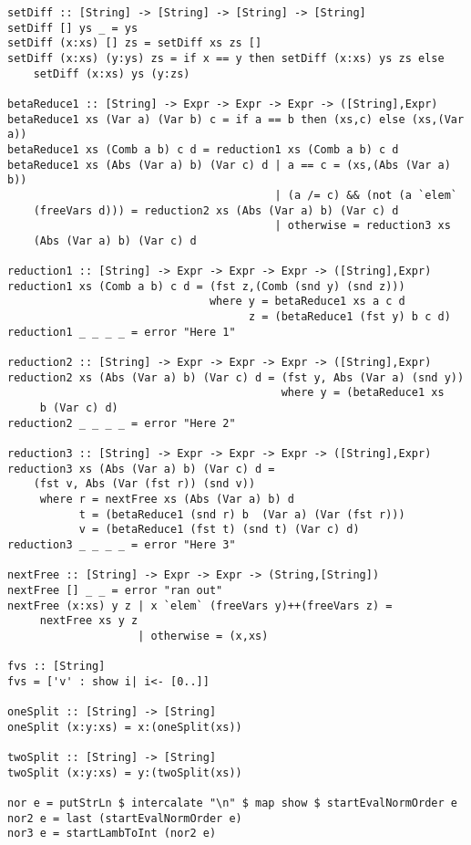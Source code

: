 \documentclass[11pt]{article}
\begin{document}
\begin{verbatim}
setDiff :: [String] -> [String] -> [String] -> [String]
setDiff [] ys _ = ys
setDiff (x:xs) [] zs = setDiff xs zs []
setDiff (x:xs) (y:ys) zs = if x == y then setDiff (x:xs) ys zs else 
    setDiff (x:xs) ys (y:zs)

betaReduce1 :: [String] -> Expr -> Expr -> Expr -> ([String],Expr)
betaReduce1 xs (Var a) (Var b) c = if a == b then (xs,c) else (xs,(Var a))
betaReduce1 xs (Comb a b) c d = reduction1 xs (Comb a b) c d
betaReduce1 xs (Abs (Var a) b) (Var c) d | a == c = (xs,(Abs (Var a) b))
                                         | (a /= c) && (not (a `elem` 
    (freeVars d))) = reduction2 xs (Abs (Var a) b) (Var c) d
                                         | otherwise = reduction3 xs 
    (Abs (Var a) b) (Var c) d
                                          
reduction1 :: [String] -> Expr -> Expr -> Expr -> ([String],Expr)
reduction1 xs (Comb a b) c d = (fst z,(Comb (snd y) (snd z)))
                               where y = betaReduce1 xs a c d
                                     z = (betaReduce1 (fst y) b c d)
reduction1 _ _ _ _ = error "Here 1"

reduction2 :: [String] -> Expr -> Expr -> Expr -> ([String],Expr)
reduction2 xs (Abs (Var a) b) (Var c) d = (fst y, Abs (Var a) (snd y))
                                          where y = (betaReduce1 xs
     b (Var c) d)
reduction2 _ _ _ _ = error "Here 2"

reduction3 :: [String] -> Expr -> Expr -> Expr -> ([String],Expr)
reduction3 xs (Abs (Var a) b) (Var c) d = 
    (fst v, Abs (Var (fst r)) (snd v))
     where r = nextFree xs (Abs (Var a) b) d
           t = (betaReduce1 (snd r) b  (Var a) (Var (fst r)))
           v = (betaReduce1 (fst t) (snd t) (Var c) d)
reduction3 _ _ _ _ = error "Here 3"

nextFree :: [String] -> Expr -> Expr -> (String,[String])
nextFree [] _ _ = error "ran out"
nextFree (x:xs) y z | x `elem` (freeVars y)++(freeVars z) =
     nextFree xs y z
                    | otherwise = (x,xs)

fvs :: [String]
fvs = ['v' : show i| i<- [0..]]

oneSplit :: [String] -> [String]
oneSplit (x:y:xs) = x:(oneSplit(xs))

twoSplit :: [String] -> [String]
twoSplit (x:y:xs) = y:(twoSplit(xs))

nor e = putStrLn $ intercalate "\n" $ map show $ startEvalNormOrder e
nor2 e = last (startEvalNormOrder e)
nor3 e = startLambToInt (nor2 e) 


\end{verbatim}
\end{document}
